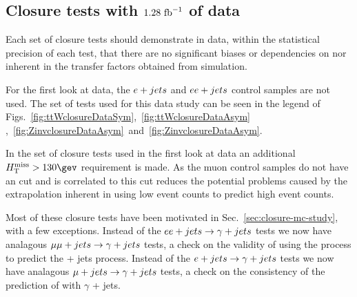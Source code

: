 \subsection{Closure tests with $1.28~\text{fb}^{-1}$ of data}
\label{sec:closure-data-study}

Each set of closure tests should demonstrate in data, within the
statistical precision of each test, that there are no significant
biases or dependencies on \njet nor \scalht inherent in the transfer
factors obtained from simulation. 

For the first look at data, the $e + jets$ and $ee + jets$ control samples are
not used. 
The set of tests used for
this data study can be seen in the legend of
Figs.~\ref{fig:ttWclosureDataSym},~\ref{fig:ttWclosureDataAsym}
,~\ref{fig:ZinvclosureDataAsym}~and~\ref{fig:ZinvclosureDataAsym}.

In the set of closure tests used in the first look at
data an additional $\mht>130\gev$ requirement is made. As the muon
control samples do not have an \alphat cut and \mht is correlated to
\alphat this cut reduces the potential problems
caused by the extrapolation inherent in using low \mht event counts to
predict high \mht event counts.


Most of these closure tests have been motivated in
Sec.~\ref{sec:closure-mc-study}, with a few exceptions. Instead of the
$ee + jets\rightarrow\gamma + jets$ tests we now have analagous
$\mu\mu + jets\rightarrow\gamma + jets$ tests, a check on the validity of using the \gj
process to predict the \znunu + jets process. Instead of the 
$e + jets\rightarrow\gamma + jets$ tests we now have analagous
$\mu + jets\rightarrow\gamma + jets$ tests, a check on 
the consistency of the prediction of \wej with $\gamma$ + jets.


